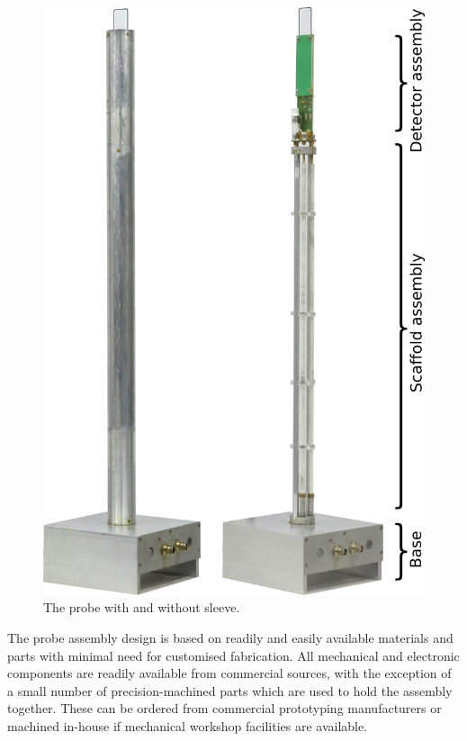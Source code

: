 \documentclass[preprint,5p]{elsarticle}
\begin{document}
\begin{figure}
\centering
\includegraphics[width=.5\linewidth,keepaspectratio=true]{./figures/ms5n17-tlp-im-181218-probe.png} 
\caption{The probe with and without sleeve.}
\label{fig:probe} 
\end{figure}
The probe assembly design is based on readily and easily available materials and parts 
with minimal need for customised fabrication.
All mechanical and electronic components are readily available from commercial sources, 
with the exception of a small number of precision-machined parts which are used 
to hold the assembly together. These can be ordered from commercial prototyping 
manufacturers or machined in-house if mechanical workshop facilities are available.
\end{document}
